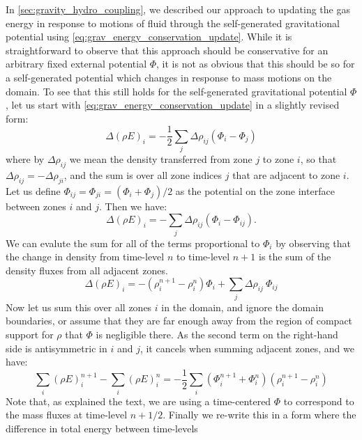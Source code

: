 \documentclass[iop]{../emulateapj}
\begin{document}
In \autoref{sec:gravity_hydro_coupling}, we described our approach to updating the gas energy
in response to motions of fluid through the self-generated gravitational potential using 
\autoref{eq:grav_energy_conservation_update}. While it is straightforward to observe that this approach
should be conservative for an arbitrary fixed external potential $\Phi$, it is not as obvious that this
should be so for a self-generated potential which changes in response to mass motions on the domain. To
see that this still holds for the self-generated gravitational potential $\Phi$, let us start with 
\autoref{eq:grav_energy_conservation_update} in a slightly revised form:
\begin{equation}
  \Delta(\rho E)_i = -\frac{1}{2}\sum_{j} \Delta\rho_{ij}(\Phi_i - \Phi_{j}) \label{eq:grav_energy_conservation_update_revised}
\end{equation}
where by $\Delta \rho_{ij}$ we mean the density transferred from zone $j$ to zone $i$, so that
$\Delta \rho_{ij} = - \Delta \rho_{ji}$, and the sum is over all zone indices $j$ that are adjacent
to zone $i$. Let us define $\Phi_{ij} = \Phi_{ji} = (\Phi_{i} + \Phi_{j}) / 2$ as the potential on the
zone interface between zones $i$ and $j$. Then we have:
\begin{equation}
  \Delta(\rho E)_i = -\sum_{j} \Delta\rho_{ij}(\Phi_i - \Phi_{ij}).
\end{equation}
We can evalute the sum for all of the terms proportional to $\Phi_i$ by observing that the change in
density from time-level $n$ to time-level $n+1$ is the sum of the density fluxes from all adjacent zones.
\begin{equation*}
  \Delta(\rho E)_i = - (\rho_i^{n+1} - \rho_i^{n}) \Phi_i + \sum_{j}\Delta \rho_{ij} \ \Phi_{ij}
\end{equation*}
Now let us sum this over all zones $i$ in the domain, and ignore the domain boundaries, or assume that they are
far enough away from the region of compact support for $\rho$ that $\Phi$ is negligible there. As the second
term on the right-hand side is antisymmetric in $i$ and $j$, it cancels when summing adjacent zones, and we have:
\begin{equation*}
  \sum_{i} (\rho E)_i^{n+1} - \sum_{i} (\rho E)_i^{n} = -\frac{1}{2}\sum_{i} (\Phi_{i}^{n+1} + \Phi_{i}^{n})(\rho_i^{n+1} - \rho_i^{n})
\end{equation*}
Note that, as explained the text, we are using a time-centered $\Phi$ to correspond to the mass fluxes
at time-level $n+1/2$. Finally we re-write this in a form where the difference in total energy between time-levels
\end{document}
